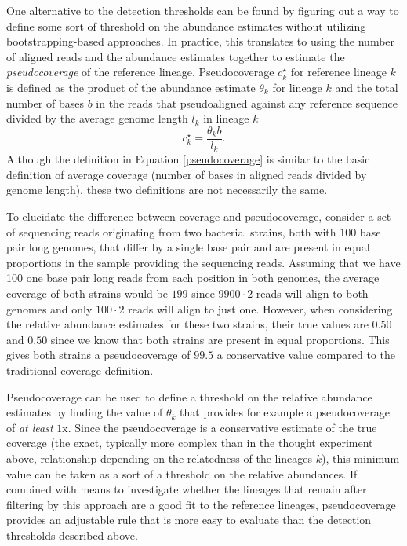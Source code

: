 \documentclass[officiallayout]{tktla}
\begin{document}
One alternative to the detection thresholds can be found by figuring
out a way to define some sort of threshold on the abundance estimates
without utilizing bootstrapping-based approaches. In practice, this
translates to using the number of aligned reads and the abundance
estimates together to estimate the \textit{pseudocoverage} of the
reference lineage. Pseudocoverage $c^{\star}_{k}$ for reference
lineage $k$ is defined as the product of the abundance estimate
$\theta_{k}$ for lineage $k$ and the total number of bases $b$ in the
reads that pseudoaligned against any reference sequence divided by the
average genome length $l_{k}$ in lineage $k$
\begin{equation}
  \label{pseudocoverage}
  c_{k}^{\star} = \frac{\theta_{k}b}{l_{k}}.
\end{equation}
Although the definition in Equation \ref{pseudocoverage} is similar to
the basic definition of average coverage (number of bases in aligned
reads divided by genome length), these two definitions are not
necessarily the same.

To elucidate the difference between coverage and pseudocoverage,
consider a set of sequencing reads originating from two bacterial
strains, both with $100$ base pair long genomes, that differ by a
single base pair and are present in equal proportions in the sample
providing the sequencing reads. Assuming that we have 100 one base
pair long reads from each position in both genomes, the average
coverage of both strains would be $199$ since $9900\cdot2$ reads
will align to both genomes and only $100\cdot2$ reads will align to
just one. However, when considering the relative abundance estimates
for these two strains, their true values are $0.50$ and $0.50$ since
we know that both strains are present in equal proportions. This gives
both strains a pseudocoverage of $99.5$ \textemdash{ } a conservative
value compared to the traditional coverage definition.

Pseudocoverage can be used to define a threshold on the relative
abundance estimates by finding the value of $\theta_{k}$ that provides
for example a pseudocoverage of \textit{at least} $1$x. Since the
pseudocoverage is a conservative estimate of the true coverage (the
exact, typically more complex than in the thought experiment above,
relationship depending on the relatedness of the lineages $k$), this
minimum value can be taken as a sort of a threshold on the relative
abundances. If combined with means to investigate whether the lineages
that remain after filtering by this approach are a good fit to the
reference lineages, pseudocoverage provides an adjustable rule that is
more easy to evaluate than the detection thresholds described above.
\end{document}
